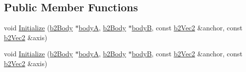 \subsection*{Public Member Functions}
\begin{DoxyCompactItemize}
\item 
void \hyperlink{structb2PrismaticJointDef_ae60043bc22b077e8c59ab248dc34652f}{Initialize} (\hyperlink{classb2Body}{b2\+Body} $\ast$\hyperlink{structb2JointDef_a592b8e186f5f0d8848ef6b7ce77f0f70}{bodyA}, \hyperlink{classb2Body}{b2\+Body} $\ast$\hyperlink{structb2JointDef_a3d1a39831332b8c5a41611c06396480a}{bodyB}, const \hyperlink{structb2Vec2}{b2\+Vec2} \&anchor, const \hyperlink{structb2Vec2}{b2\+Vec2} \&axis)
\item 
void \hyperlink{structb2PrismaticJointDef_ae60043bc22b077e8c59ab248dc34652f}{Initialize} (\hyperlink{classb2Body}{b2\+Body} $\ast$\hyperlink{structb2JointDef_a592b8e186f5f0d8848ef6b7ce77f0f70}{bodyA}, \hyperlink{classb2Body}{b2\+Body} $\ast$\hyperlink{structb2JointDef_a3d1a39831332b8c5a41611c06396480a}{bodyB}, const \hyperlink{structb2Vec2}{b2\+Vec2} \&anchor, const \hyperlink{structb2Vec2}{b2\+Vec2} \&axis)
\end{DoxyCompactItemize}
